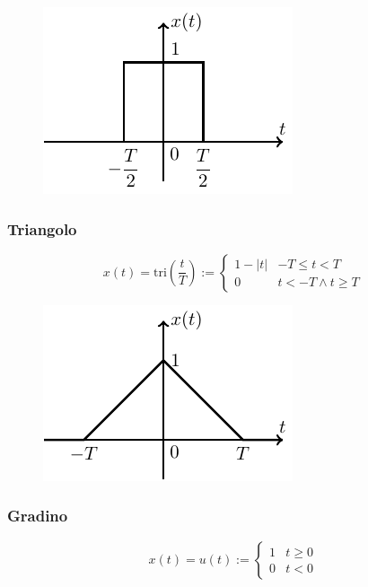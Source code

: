 \documentclass{article}
\newcommand{\tri}{\mathrm{tri}}
\numberwithin{equation}{subsection}
\begin{document}
\begin{figure}[H]%
    \centering
    \includegraphics{finestra.pdf}%
\end{figure}

\subsubsection{Triangolo}

\begin{equation}
    x(t)=\tri \left(\displaystyle\frac{t}{T}\right):=\begin{cases}
        1-|t| & -T\leq t < T\\
        0 & t<-T \land t\geq T
    \end{cases}
\end{equation}

\begin{figure}[H]%
    \centering
    \includegraphics{triangolo.pdf}%
\end{figure}

\subsubsection{Gradino}

\begin{equation}
    x(t)=u(t):=\begin{cases}
        1 & t\geq0\\
        0 & t<0
    \end{cases}
\end{equation}
\end{document}
